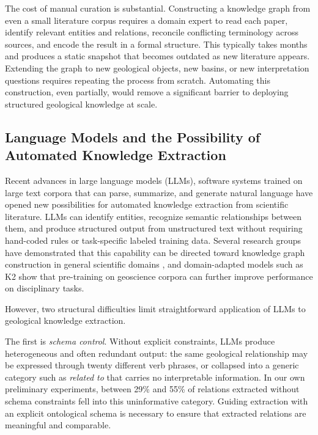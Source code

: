 \documentclass[10pt]{article}
\begin{document}
The cost of manual curation is substantial. Constructing a knowledge
graph from even a small literature corpus requires a domain expert to
read each paper, identify relevant entities and relations, reconcile
conflicting terminology across sources, and encode the result in a
formal structure. This typically takes months and produces a static
snapshot that becomes outdated as new literature appears. Extending
the graph to new geological objects, new basins, or new
interpretation questions requires repeating the process from scratch.
Automating this construction, even partially, would remove a
significant barrier to deploying structured geological knowledge at
scale.

\subsection{Language Models and the Possibility of Automated
Knowledge Extraction}

Recent advances in large language models (LLMs), software systems
trained on large text corpora that can parse, summarize, and generate
natural language have opened new possibilities for automated
knowledge extraction from scientific literature. LLMs can identify
entities, recognize semantic relationships between them, and produce
structured output from unstructured text without requiring hand-coded
rules or task-specific labeled training data. Several research groups
have demonstrated that this capability can be directed toward
knowledge graph construction in general scientific domains
\citep{bian2025llmempoweredknowledgegraphconstruction,zhang2024extractdefinecanonicalizellmbased}, and domain-adapted models such as K2 \citep{deng2023k2foundationlanguagemodel} show
that pre-training on geoscience corpora can further improve
performance on disciplinary tasks.

However, two structural difficulties limit straightforward
application of LLMs to geological knowledge extraction.

The first is \emph{schema control}. Without explicit constraints,
LLMs produce heterogeneous and often redundant output: the same
geological relationship may be expressed through twenty different
verb phrases, or collapsed into a generic category such as
\emph{related to} that carries no interpretable information. In
our own preliminary experiments, between 29\% and 55\% of relations
extracted without schema constraints fell into this uninformative
category. Guiding extraction with an explicit ontological schema
is necessary to ensure that extracted relations are meaningful and
comparable.
\end{document}
